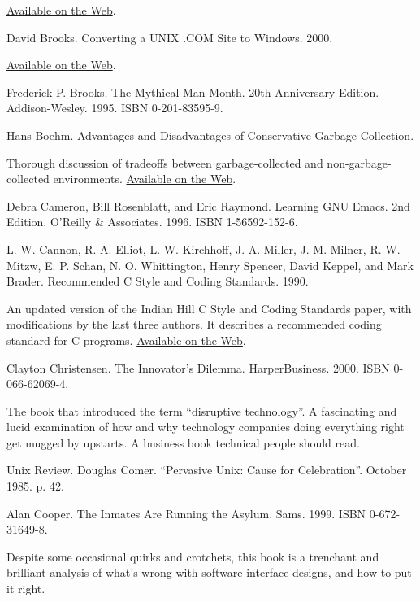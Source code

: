 \documentclass[12pt,oneside]{book}
\begin{document}
\begin{common-format}
\begin{thebibliography}{9}
\href{http://www.icce.rug.nl/documents/cplusplus/cplusplus.html}{Available on the Web}.

 David Brooks. Converting a UNIX .COM Site to Windows. 2000.

\href{http://www.securityoffice.net/mssecrets/hotmail.html#_Toc491601819}{Available on the Web}.

 Frederick P. Brooks. The Mythical Man-Month. 20th Anniversary Edition. Addison-Wesley. 1995. ISBN 0-201-83595-9.

 Hans Boehm. Advantages and Disadvantages of Conservative Garbage Collection.

Thorough discussion of tradeoffs between garbage-collected and non-garbage-collected environments. \href{http://www.hpl.hp.com/personal/Hans_Boehm/gc/issues.html}{Available on the Web}.

 Debra Cameron, Bill Rosenblatt, and Eric Raymond. Learning GNU Emacs. 2nd Edition. O'Reilly \&{} Associates. 1996. ISBN 1-56592-152-6.

 L. W. Cannon, R. A. Elliot, L. W. Kirchhoff, J. A. Miller, J. M. Milner, R. W. Mitzw, E. P. Schan, N. O. Whittington, Henry Spencer, David Keppel, and Mark Brader. Recommended C Style and Coding Standards. 1990.

An updated version of the Indian Hill C Style and Coding Standards paper, with modifications by the last three authors. It describes a recommended coding standard for C programs. \href{http://www.apocalypse.org/pub/u/paul/docs/cstyle/cstyle.htm}{Available on the Web}.

 Clayton Christensen. The Innovator's Dilemma. HarperBusiness. 2000. ISBN 0-066-62069-4.

The book that introduced the term “disruptive technology”. A fascinating and lucid examination of how and why technology companies doing everything right get mugged by upstarts. A business book technical people should read.

 Unix Review. Douglas Comer. “Pervasive Unix: Cause for Celebration”. October 1985. p. 42.

 Alan Cooper. The Inmates Are Running the Asylum. Sams. 1999. ISBN 0-672-31649-8.

Despite some occasional quirks and crotchets, this book is a trenchant and brilliant analysis of what's wrong with software interface designs, and how to put it right.


\end{thebibliography}
\end{common-format}
\end{document}
